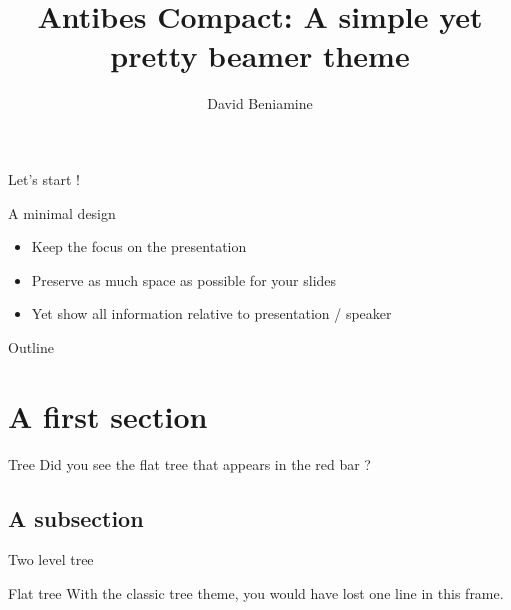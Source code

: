 \documentclass[xcolor={usenames,dvipsnames}]{beamer}
\title[AntibesCompact]{Antibes Compact: A simple yet pretty beamer theme}
\author[Dbeniamine]{David Beniamine}
\institute[No inst]{No institutution for this work}
\begin{document}
\begin{frame}{}
    \titlepage
\end{frame}





\begin{frame}{Let's start !}
    \begin{block}{A minimal design}
        \begin{itemize}
            \item Keep the focus on the presentation
            \item Preserve as much space as possible for your slides
            \item Yet show all information relative to presentation / speaker
        \end{itemize}
    \end{block}
\end{frame}

\begin{frame}{Outline}
    \tableofcontents
\end{frame}

\section{A first section}
\begin{frame}{Tree}
    Did you see the flat tree that appears in the red bar ?
\end{frame}
\subsection{A subsection}
\begin{frame}{Two level tree}
    \begin{alertblock}{Flat tree}
       With the classic tree theme, you would have lost one line in this frame.
    \end{alertblock}
\end{frame}
\end{document}
